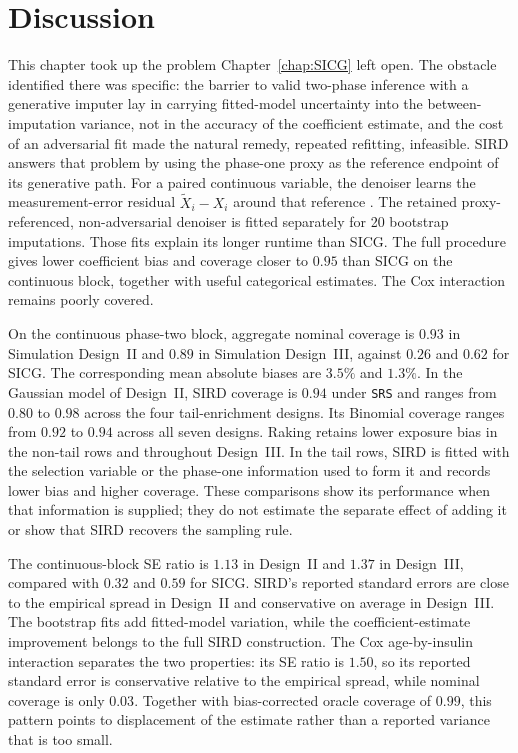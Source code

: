 \section{Discussion}
\label{sec:sird_discussion}

This chapter took up the problem Chapter~\ref{chap:SICG} left open. The obstacle identified there was specific: the barrier to valid two-phase inference with a generative imputer lay in carrying fitted-model uncertainty into the between-imputation variance, not in the accuracy of the coefficient estimate, and the cost of an adversarial fit made the natural remedy, repeated refitting, infeasible. SIRD answers that problem by using the phase-one proxy as the reference endpoint of its generative path. For a paired continuous variable, the denoiser learns the measurement-error residual \(\tilde X_i-X_i\) around that reference \citep{liu2024residual,ho2020denoising,kotelnikov2023tabddpm}. The retained proxy-referenced, non-adversarial denoiser is fitted separately for 20 bootstrap imputations. Those fits explain its longer runtime than SICG. The full procedure gives lower coefficient bias and coverage closer to \(0.95\) than SICG on the continuous block, together with useful categorical estimates. The Cox interaction remains poorly covered.

On the continuous phase-two block, aggregate nominal coverage is \(0.93\) in Simulation Design~II and \(0.89\) in Simulation Design~III, against \(0.26\) and \(0.62\) for SICG. The corresponding mean absolute biases are \(3.5\%\) and \(1.3\%\). In the Gaussian model of Design~II, SIRD coverage is \(0.94\) under \texttt{SRS} and ranges from \(0.80\) to \(0.98\) across the four tail-enrichment designs. Its Binomial coverage ranges from \(0.92\) to \(0.94\) across all seven designs. Raking retains lower exposure bias in the non-tail rows and throughout Design~III. In the tail rows, SIRD is fitted with the selection variable or the phase-one information used to form it and records lower bias and higher coverage. These comparisons show its performance when that information is supplied; they do not estimate the separate effect of adding it or show that SIRD recovers the sampling rule.

The continuous-block SE ratio is \(1.13\) in Design~II and \(1.37\) in Design~III, compared with \(0.32\) and \(0.59\) for SICG. SIRD's reported standard errors are close to the empirical spread in Design~II and conservative on average in Design~III. The bootstrap fits add fitted-model variation, while the coefficient-estimate improvement belongs to the full SIRD construction. The Cox age-by-insulin interaction separates the two properties: its SE ratio is \(1.50\), so its reported standard error is conservative relative to the empirical spread, while nominal coverage is only \(0.03\). Together with bias-corrected oracle coverage of \(0.99\), this pattern points to displacement of the estimate rather than a reported variance that is too small.

